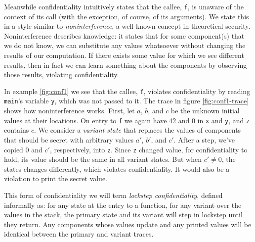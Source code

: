 Meanwhile confidentiality intuitively states that the callee, {\tt f}, is unaware
of the context of its call (with the exception, of course, of its arguments).
We state this in a style similar to {\em noninterference}, a well-known concept in theoretical
security. Noninterference describes knowledge: it states that for some component(s)
that we do not know, we can substitute any values whatsoever without changing the results
of our computation. If there exists some value for which we see different results, then
in fact we can learn something about the components by observing those results, violating
confidentiality.

In example \ref{fig:conf1} we see that the callee, {\tt f}, violates confidentiality
by reading {\tt main}'s variable {\tt y}, which was not passed to it. The trace
in figure \ref{fig:conf1-trace} shows how noninterference works. First, let \(a\),
\(b\), and \(c\) be the unknown initial values at their locations. On entry to {\tt f}
we again have 42 and 0 in {\tt x} and {\tt y}, and {\tt z} contains \(c\). We consider a
{\em variant state} that replaces the values of components that should be secret with
arbitrary values \(a'\), \(b'\), and \(c'\). After a step, we've copied 0 and \(c'\),
respectively, into {\tt z}. Since {\tt z} changed value, for confidentiality to hold,
its value should be the same in all variant states. But when \(c' \not = 0\), the
states changes differently, which violates confidentiality. It would also be a violation
to print the secret value.

This form of confidentiality we will term {\em lockstep confidentiality}, defined informally
as: for any state at the entry to a function, for any variant over the values in the stack,
the primary state and its variant will step in lockstep until they return. Any components
whose values update and any printed values will be identical between the primary and variant
traces.

